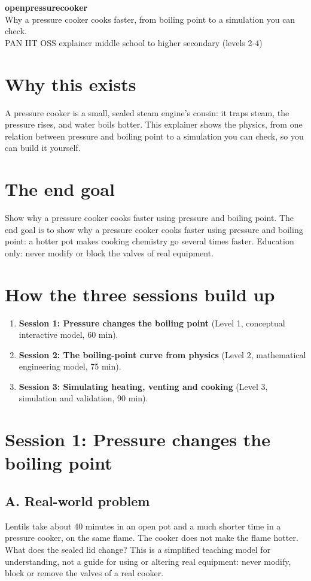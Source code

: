 \documentclass[11pt,a4paper]{article}
\begin{document}
\begin{center}{\LARGE\bfseries openpressurecooker}\\[0.4em]{\large Why a pressure cooker cooks faster, from boiling point to a simulation you can check.}\\[0.2em]\small PAN IIT OSS explainer \textbullet{} middle school to higher secondary (levels 2-4)\end{center}

\section*{Why this exists}
A pressure cooker is a small, sealed steam engine's cousin: it traps steam, the pressure rises, and water boils hotter. This explainer shows the physics, from one relation between pressure and boiling point to a simulation you can check, so you can build it yourself.

\section*{The end goal}
Show why a pressure cooker cooks faster using pressure and boiling point. The end goal is to show why a pressure cooker cooks faster using pressure and boiling point: a hotter pot makes cooking chemistry go several times faster. Education only: never modify or block the valves of real equipment.

\section*{How the three sessions build up}
\begin{enumerate}[nosep]
\item \textbf{Session 1: Pressure changes the boiling point} (Level 1, conceptual interactive model, 60 min).
\item \textbf{Session 2: The boiling-point curve from physics} (Level 2, mathematical engineering model, 75 min).
\item \textbf{Session 3: Simulating heating, venting and cooking} (Level 3, simulation and validation, 90 min).
\end{enumerate}

\section{Session 1: Pressure changes the boiling point}

\subsection*{A. Real-world problem}
Lentils take about 40 minutes in an open pot and a much shorter time in a pressure cooker, on the same flame. The cooker does not make the flame hotter. What does the sealed lid change? This is a simplified teaching model for understanding, not a guide for using or altering real equipment: never modify, block or remove the valves of a real cooker.
\end{document}

